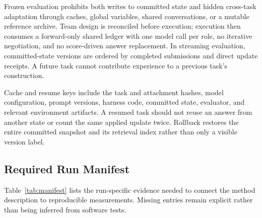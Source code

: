 Frozen evaluation prohibits both writes to committed state and hidden cross-task adaptation through caches, global variables, shared conversations, or a mutable reference archive. Team design is reconciled before execution; execution then consumes a forward-only shared ledger with one model call per role, no iterative negotiation, and no score-driven answer replacement. In streaming evaluation, committed-state versions are ordered by completed submissions and direct update receipts. A future task cannot contribute experience to a previous task's construction.

Cache and resume keys include the task and attachment hashes, model configuration, prompt versions, harness code, committed state, evaluator, and relevant environment artifacts. A resumed task should not reuse an answer from another state or count the same applied update twice. Rollback restores the entire committed snapshot and its retrieval index rather than only a visible version label.

\subsection{Required Run Manifest}
\label{app:manifest}

Table~\ref{tab:manifest} lists the run-specific evidence needed to connect the method description to reproducible measurements. Missing entries remain explicit rather than being inferred from software tests.

